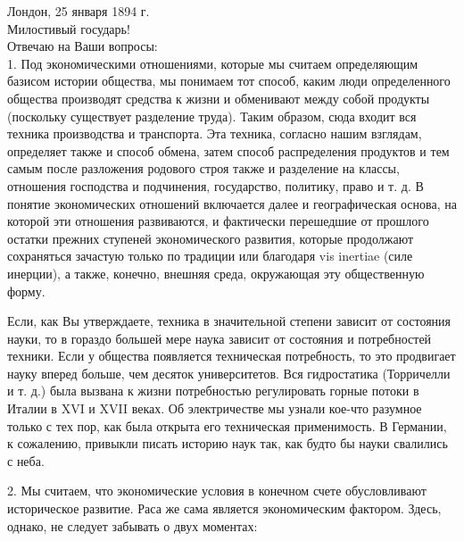 \documentclass[12pt]{article}
\newcommand{\parnum}{(\arabic{parcount})}
\newcounter{parcount}
\newenvironment{parnumbers}{%
  \par%
  \everypar{\noindent \stepcounter{parcount}\marginpar[]{\parnum}}%
}{}
\begin{document}
\begin{parnumbers}
  Лондон, 25 января 1894 г. \\
    Милостивый государь! \\
    Отвечаю на Ваши вопросы: \\
    1. Под экономическими отношениями, которые мы считаем определяющим базисом истории общества, мы понимаем тот способ, каким люди определенного общества производят средства к жизни и обменивают между собой продукты (поскольку существует разделение труда). Таким образом, сюда входит вся техника производства и транспорта. Эта техника, согласно нашим взглядам, определяет также и способ обмена, затем способ распределения продуктов и тем самым после разложения родового строя также и разделение на классы, отношения господства и подчинения, государство, политику, право и т. д. В понятие экономических отношений включается далее и географическая основа, на которой эти отношения развиваются, и фактически перешедшие от прошлого остатки прежних ступеней экономического развития, которые продолжают сохраняться зачастую только по традиции или благодаря vis inertiae (силе инерции), а также, конечно, внешняя среда, окружающая эту общественную форму.

    Если, как Вы утверждаете, техника в значительной степени зависит от состояния науки, то в гораздо большей мере наука зависит от состояния и потребностей техники. Если у общества появляется техническая потребность, то это продвигает науку вперед больше, чем десяток университетов. Вся гидростатика (Торричелли и т. д.) была вызвана к жизни потребностью регулировать горные потоки в Италии в XVI и XVII веках. Об электричестве мы узнали кое-что разумное только с тех пор, как была открыта его техническая применимость. В Германии, к сожалению, привыкли писать историю наук так, как будто бы науки свалились с неба.

    2. Мы считаем, что экономические условия в конечном счете обусловливают историческое развитие. Раса же сама является экономическим фактором. Здесь, однако, не следует забывать о двух моментах:


\end{parnumbers}
\end{document}
